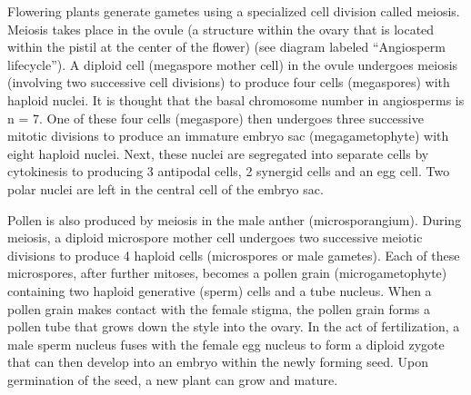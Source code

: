 Flowering plants generate gametes using a specialized cell division called meiosis. Meiosis takes place in the ovule (a structure within the ovary that is located within the pistil at the center of the flower) (see diagram labeled ``Angiosperm lifecycle''). A diploid cell (megaspore mother cell) in the ovule undergoes meiosis (involving two successive cell divisions) to produce four cells (megaspores) with haploid nuclei. It is thought that the basal chromosome number in angiosperms is n = 7. One of these four cells (megaspore) then undergoes three successive mitotic divisions to produce an immature embryo sac (megagametophyte) with eight haploid nuclei. Next, these nuclei are segregated into separate cells by cytokinesis to producing 3 antipodal cells, 2 synergid cells and an egg cell. Two polar nuclei are left in the central cell of the embryo sac.

Pollen is also produced by meiosis in the male anther (microsporangium). During meiosis, a diploid microspore mother cell undergoes two successive meiotic divisions to produce 4 haploid cells (microspores or male gametes). Each of these microspores, after further mitoses, becomes a pollen grain (microgametophyte) containing two haploid generative (sperm) cells and a tube nucleus. When a pollen grain makes contact with the female stigma, the pollen grain forms a pollen tube that grows down the style into the ovary. In the act of fertilization, a male sperm nucleus fuses with the female egg nucleus to form a diploid zygote that can then develop into an embryo within the newly forming seed. Upon germination of the seed, a new plant can grow and mature.



